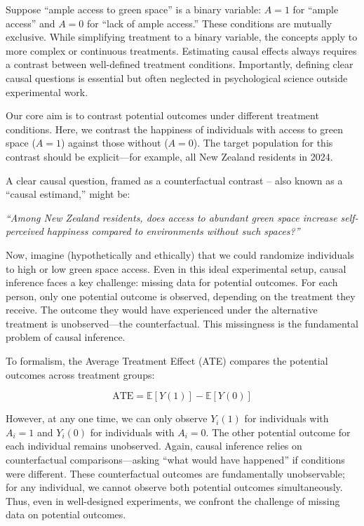 \documentclass[
  singlecolumn]{article}
\begin{document}
Suppose ``ample access to green space'' is a binary variable: \(A = 1\)
for ``ample access'' and \(A = 0\) for ``lack of ample access.'' These
conditions are mutually exclusive. While simplifying treatment to a
binary variable, the concepts apply to more complex or continuous
treatments. Estimating causal effects always requires a contrast between
well-defined treatment conditions. Importantly, defining clear causal
questions is essential but often neglected in psychological science
outside experimental work.

Our core aim is to contrast potential outcomes under different treatment
conditions. Here, we contrast the happiness of individuals with access
to green space (\(A = 1\)) against those without (\(A = 0\)). The target
population for this contrast should be explicit---for example, all New
Zealand residents in 2024.

A clear causal question, framed as a counterfactual contrast -- also
known as a ``causal estimand,'' might be:

\emph{``Among New Zealand residents, does access to abundant green space
increase self-perceived happiness compared to environments without such
spaces?''}

Now, imagine (hypothetically and ethically) that we could randomize
individuals to high or low green space access. Even in this ideal
experimental setup, causal inference faces a key challenge: missing data
for potential outcomes. For each person, only one potential outcome is
observed, depending on the treatment they receive. The outcome they
would have experienced under the alternative treatment is
unobserved---the counterfactual. This missingness is the fundamental
problem of causal inference.

To formalism, the Average Treatment Effect (ATE) compares the potential
outcomes across treatment groups:

\[
\text{ATE} = \mathbb{E}[Y(1)] - \mathbb{E}[Y(0)]
\]

However, at any one time, we can only observe \(Y_i(1)\) for individuals
with \(A_i = 1\) and \(Y_i(0)\) for individuals with \(A_i = 0\). The
other potential outcome for each individual remains unobserved. Again,
causal inference relies on counterfactual comparisons---asking ``what
would have happened'' if conditions were different. These counterfactual
outcomes are fundamentally unobservable; for any individual, we cannot
observe both potential outcomes simultaneously. Thus, even in
well-designed experiments, we confront the challenge of missing data on
potential outcomes.
\end{document}
